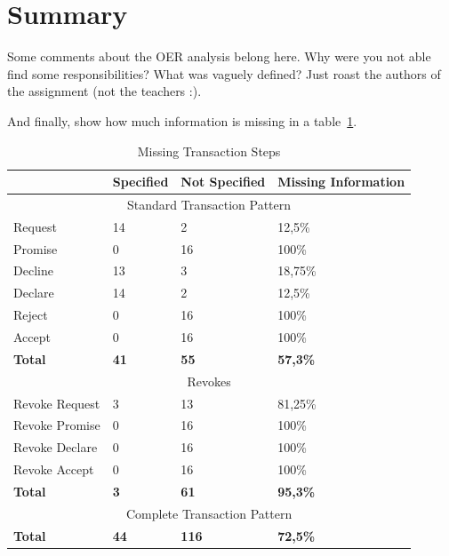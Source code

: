 \section{Summary}

Some comments about the OER analysis belong here. Why were you not able find some responsibilities? What was vaguely defined? Just roast the authors of the assignment (not the teachers :). 

And finally, show how much information is missing in a table~\cref{tab:missing_transaction_steps}. 

\begin{table}[h]\centering
\caption{Missing Transaction Steps}
\label{tab:missing_transaction_steps}
\begin{tabular}{|l||l|l|l|}
\hline
                      & Specified    & Not Specified & Missing Information \\ \hline
\multicolumn{4}{|c|}{Standard Transaction Pattern}                        \\ \hline
Request               & 14           & 2            & 12,5\%             \\ \hline
Promise               & 0           & 16           & 100\%            \\ \hline
Decline               & 13          & 3           & 18,75\%             \\ \hline
Declare               & 14           & 2            & 12,5\%              \\ \hline
Reject                & 0            & 16           & 100\%             \\ \hline
Accept                & 0           & 16            & 100\%            \\ \hline
\textbf{Total}        & \textbf{41} & \textbf{55}  & \textbf{57,3\%}   \\ \hline
\multicolumn{4}{|c|}{Revokes}                                             \\ \hline
Revoke Request        & 3            & 13           & 81,25\%             \\ \hline
Revoke Promise        & 0            & 16           & 100\%             \\ \hline
Revoke Declare        & 0            & 16           & 100\%            \\ \hline
Revoke Accept         & 0            & 16           & 100\%             \\ \hline
\textbf{Total}        & \textbf{3}   & \textbf{61} & \textbf{95,3\%}    \\ \hline
\multicolumn{4}{|c|}{Complete Transaction Pattern}                        \\ \hline
\textbf{Total}        & \textbf{44} & \textbf{116} & \textbf{72,5\%}    \\ \hline
\end{tabular}

\end{table}